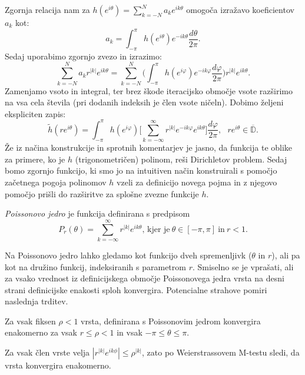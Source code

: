 \documentclass[mat1]{fmfdelo}
\begin{document}
        Zgornja relacija nam za $h(e^{i\theta}) = \sum_{k = -N}^{N}{a_k e^{ik\theta}}$ omogoča izražavo koeficientov $a_k$ kot:
        $$
            a_ k = \int_{-\pi}^{\pi}{h(e^{i\theta}) e^{-ik\theta}\frac{d\theta}{2\pi}}.
        $$
    Sedaj uporabimo zgornjo zvezo in izrazimo:
    $$
        \sum_{k = - N}^{N}{ a_k r^{|k|}e^{ik\theta}} = \sum_{k = - N}^{N} \bigg(\int_{-\pi}^{\pi}{h(e^{i \varphi}) e^{- i k \varphi} \frac{d \varphi}{2 \pi}}\bigg) r^{|k|} e^{i k \theta}.
    $$
    Zamenjamo vsoto in integral, ter brez škode iteracijsko območje vsote razširimo na vsa cela števila (pri dodanih indeksih je člen vsote ničeln). Dobimo željeni ekspliciten zapis:
    \begin{equation}
        \label{int1}
        \tag{P}
        \widetilde{h}(r e^{i \theta}) = \int_{-\pi}^{\pi}{h(e^{i \varphi}) \bigg[\sum_{k = - \infty}^{\infty} r^{|k|} e^{- i k \varphi} e^{i k \theta}} \bigg]\frac{d \varphi}{2 \pi}, ~~~ r e^{i\theta} \in \overline{\mathbb{D}}.
    \end{equation}
    Že iz načina konstrukcije in sprotnih komentarjev je jasno, da funkcija te oblike za primere, ko je $h$ (trigonometričen) polinom, reši Dirichletov problem.
    Sedaj bomo zgornjo funkcijo, ki smo jo na intuitiven način konstruirali s pomočjo začetnega pogoja polinomov $h$ vzeli za definicijo novega pojma in z njegovo pomočjo prišli do razširitve za splošne zvezne funkcije $h$.
    \begin{definicija}
        \emph{Poissonovo jedro} je funkcija definirana s predpisom
        $$
           P_r(\theta) = \sum_{k = -\infty}^{\infty}{r^{|k|} e^{i k \theta}}\text{, kjer je}~\theta \in [-\pi, \pi]~\text{in}~ r < 1.
        $$
    \end{definicija}
    Na Poissonovo jedro lahko gledamo kot funkcijo dveh spremenljivk ($\theta$ in $r$), ali pa kot na družino funkcij, indeksiranih s parametrom $r$.
    \newline
    Smiselno se je vprašati, ali za vsako vrednost iz definicijskega območje Poissonovega jedra vrsta na desni strani definicijske enakosti sploh konvergira. Potencialne strahove pomiri naslednja trditev.
    \begin{trditev}
        Za vsak fiksen $\rho < 1$ vrsta, definirana s Poissonovim jedrom konvergira enakomerno za vsak $r\leq \rho < 1$ in vsak $ -\pi \leq \theta \leq \pi$.
    \end{trditev}
    \begin{dokaz}
        Za vsak člen vrste velja $|r^{|k|} e^{i k \phi}| \leq \rho^{|k|}$, zato po Weierstrassovem M-testu sledi, da vrsta konvergira enakomerno.
    \end{dokaz}
\end{document}
